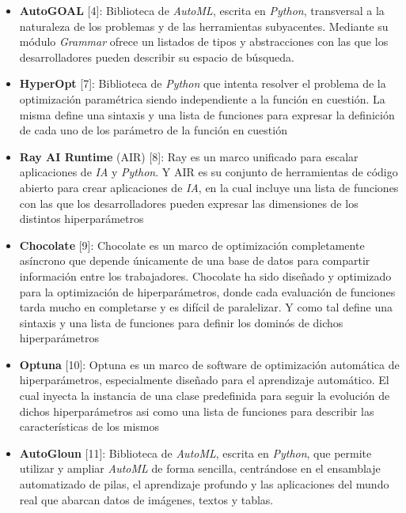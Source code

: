 \begin{itemize}

      \item  {\bf AutoGOAL} [4]: Biblioteca de {\it AutoML}, escrita en {\it Python}, transversal a la
            naturaleza de los problemas y de las herramientas subyacentes. Mediante su módulo {\it Grammar}
            ofrece un listados de tipos y abstracciones con las que los desarrolladores pueden describir
            su espacio de búsqueda.
      \item {\bf HyperOpt} [7]: Biblioteca de {\it Python} que intenta resolver el problema de la optimización
            paramétrica siendo independiente a la función en cuestión. La misma define una sintaxis y
            una lista de funciones para expresar la definición de cada uno de los parámetro de la
            función en cuestión
      \item {\bf Ray AI Runtime} (AIR) [8]: Ray es un marco unificado para escalar aplicaciones de {\it IA} y
                  {\it Python}. Y AIR es su conjunto de herramientas de código abierto para crear aplicaciones de
                  {\it IA}, en la cual incluye una lista de funciones con las que los desarrolladores pueden expresar
            las dimensiones de los distintos hiperparámetros
      \item {\bf Chocolate} [9]: Chocolate es un marco de optimización completamente asíncrono que depende
            únicamente de una base de datos para compartir información entre los trabajadores. Chocolate
            ha sido diseñado y optimizado para la optimización de hiperparámetros, donde cada evaluación
            de funciones tarda mucho en completarse y es difícil de paralelizar. Y como tal define una
            sintaxis y una lista de funciones para definir los dominós de dichos hiperparámetros
      \item {\bf Optuna} [10]: Optuna es un marco de software de optimización automática de hiperparámetros,
            especialmente diseñado para el aprendizaje automático. El cual inyecta la instancia de una
            clase predefinida para seguir la evolución de dichos hiperparámetros asi como
            una lista de funciones para describir las características de los mismos
      \item {\bf AutoGloun} [11]: Biblioteca de {\it AutoML}, escrita en {\it Python}, que permite utilizar y
            ampliar {\it AutoML} de forma sencilla, centrándose en el ensamblaje automatizado de pilas, el
            aprendizaje profundo y las aplicaciones del mundo real que abarcan datos de imágenes, textos y tablas.

\end{itemize}
